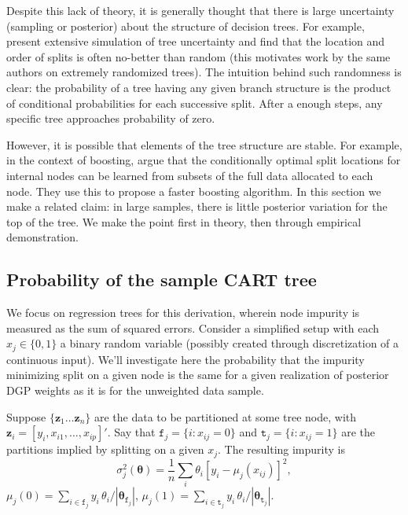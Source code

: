 \documentclass{article}
\begin{document}
Despite this lack of theory, it is generally thought that there is large
  uncertainty (sampling or posterior) about the structure of decision trees.
  For example, \citet{geurts_investigation_2000} present extensive simulation
  of tree uncertainty and find that the location and order of splits
  is often no-better than random (this motivates work by the same
  authors on extremely randomized trees). The intuition behind such randomness
  is clear: the probability of a tree having any given branch structure is the
  product of conditional probabilities for each successive split. After a
  enough steps, any specific tree approaches probability of zero.

However, it is possible that elements of the tree structure are
 stable. For example, in the context of boosting,
\citet{appel_quickly_2013} argue that the conditionally optimal
split locations for internal nodes can be learned from
subsets of the full data allocated to each node.  They use this to propose
a faster boosting algorithm. In this section we make a related claim: 
in large samples, there is little posterior variation for the top of the tree. 
We make the point first in theory, then through empirical demonstration.

\subsection{Probability of the sample CART
tree}\label{probability-of-the-sample-cart-tree}


We focus on regression trees for this derivation, wherein node impurity is
measured as the sum of squared errors. Consider a simplified setup
with each $x_j \in \{0,1\}$  a binary random variable (possibly
created through discretization of a continuous input).  We'll investigate here the probability that the impurity minimizing split on a given node is the same for a given realization of posterior DGP weights as it is for the unweighted data sample.   

Suppose  $\{\mathbf{z}_1 \ldots \mathbf{z}_n\}$ are the data to be partitioned at some tree node, with $\mathbf{z}_i = [y_i, x_{i1}, \dots, x_{ip}]'$.  Say that
$\texttt{f}_j=\{i:x_{ij}=0\}$ and $\texttt{t}_j=\{i:x_{ij}=1\}$ are the
partitions implied by splitting on a given $x_j$. The resulting impurity is
\begin{equation}
\sigma^2_j(\boldsymbol{\theta}) = \frac{1}{n}\sum_i \theta_i \left[y_i - \mu_j(x_{ij})\right]^2,
\end{equation}
$\mu_j(0) = \sum_{i \in \texttt{f}_j}y_i \,\theta_i/\left|\boldsymbol{\theta}_{\texttt{f}_j}\right|$,
$\mu_j(1) = \sum_{i \in \texttt{t}_j}y_i \,\theta_i/\left|\boldsymbol{\theta}_{\texttt{t}_j}\right|$.
\end{document}
